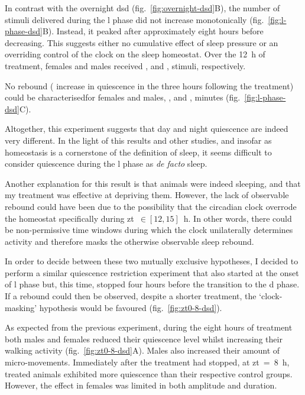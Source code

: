 In contrast with the overnight \gls{dsd} (fig.~\ref{fig:overnight-dsd}B), the number of stimuli delivered during the \gls{l} phase did not increase monotonically (fig.~\ref{fig:l-phase-dsd}B).
Instead, it peaked after approximately eight hours before decreasing. 
This suggests either no cumulative effect of sleep pressure or an overriding control of the clock on the sleep homeostat.
Over the 12~h of treatment, females and males received , and , stimuli, respectively.

No rebound (\ie{} increase in quiescence in the three hours following the treatment) could be 
characterised\emd{}for females and males,
, and
, minutes
(fig.~\ref{fig:l-phase-dsd}C).

Altogether, this experiment suggests that day and night quiescence are indeed very different.
In the light of this results and other studies\cite{hendricks_rest_2000,huber_sleep_2004,faville_how_2015}, and insofar as homeostasis is a cornerstone of the definition of sleep, it seems difficult to consider quiescence during the \gls{l} phase as \emph{de facto} sleep.

Another explanation for this result is that animals were indeed sleeping, and that my treatment was effective at depriving them.
However, the lack of observable rebound could have been due to the possibility that the circadian clock overrode the homeostat specifically during \gls{zt}~$\in [12,15]$~h.
In other words, there could be non-permissive time windows during which the clock unilaterally determines activity and therefore masks the otherwise observable sleep rebound.

In order to decide between these two mutually exclusive hypotheses, I decided to perform a similar quiescence restriction experiment that also started at the onset of \gls{l} phase but, this time, 
stopped four hours before the transition to the \gls{d} phase.
If a rebound could then be observed, despite a shorter treatment,
the `clock-masking' hypothesis would be favoured (fig.~\ref{fig:zt0-8-dsd}).



As expected from the previous experiment, during the eight hours of treatment both males and females reduced their quiescence level whilst increasing their walking activity (fig.~\ref{fig:zt0-8-dsd}A).
Males also increased their amount of micro-movements.
Immediately after the treatment had stopped, at \gls{zt}~=~8~h, treated animals exhibited more quiescence than their respective control groups. 
However, the effect in females was limited in both amplitude and duration.

